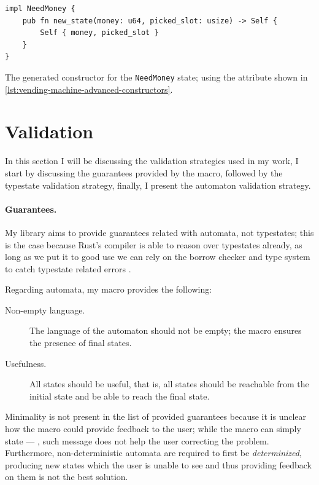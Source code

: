 \begin{listing}
    \begin{verbatim}
impl NeedMoney {
    pub fn new_state(money: u64, picked_slot: usize) -> Self {
        Self { money, picked_slot }
    }
}
    \end{verbatim}
    \caption{
        The generated constructor for the \textcolor{structblue}{\texttt{NeedMoney}} state;
        using the attribute shown in \autoref{lst:vending-machine-advanced-constructors}.
    }
    \label{lst:vending-machine-advanced-constructors-expansion}
\end{listing}



\section{Validation}\label{sec:validation}

In this section I will be discussing the validation strategies used in my work,
I start by discussing the guarantees provided by the macro,
followed by the typestate validation strategy, finally, I present the automaton validation strategy.

\paragraph{Guarantees.} My library aims to provide guarantees related with automata, not typestates;
this is the case because Rust's compiler is able to reason over typestates already,
as long as we put it to good use we can rely on the borrow checker and type system to catch typestate related errors
.

Regarding automata, my macro provides the following:
\begin{description}
    \item[Non-empty language.] The language of the automaton should not be empty;
        the macro ensures the presence of final states.
    \item[Usefulness.] All states should be useful, that is,
        all states should be reachable from the initial state and be able to reach the final state.
\end{description}

Minimality is not present in the list of provided guarantees because it is unclear how the macro could provide feedback to the user;
while the macro can simply state --- , such message does not help the user correcting the problem.
Furthermore, non-deterministic automata are required to first be \emph{determinized},
producing new states which the user is unable to see and thus providing feedback on them is not the best solution.

